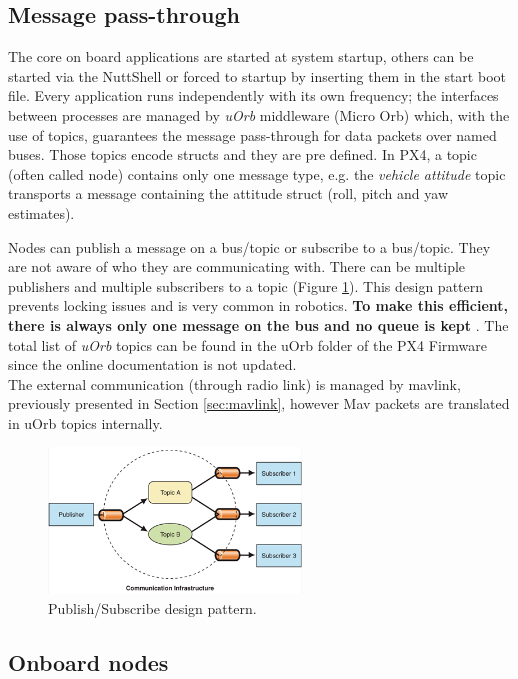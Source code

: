 \subsection{Message pass-through}
The core on board applications are started at system startup, others can be started via the NuttShell or forced to startup by inserting them in the start boot file. Every application runs independently with its own frequency; the interfaces between processes are managed by \textit{uOrb} middleware (Micro Orb) which, with the use of topics, guarantees the message pass-through for data packets over named buses. Those topics encode structs and they are pre defined. In PX4, a topic (often called node) contains only one message type, e.g. the \textit{vehicle attitude} topic transports a message containing the attitude struct (roll, pitch and yaw estimates).\par Nodes can publish a message on a bus/topic or subscribe to a bus/topic. They are not aware of who they are communicating with. There can be multiple publishers and multiple subscribers to a topic (Figure \ref{figure:pubsub}). This design pattern prevents locking issues and is very common in robotics. \textbf{To make this efficient, there is always only one message on the bus and no queue is kept} \cite{uOrb}. The total list of \textit{uOrb} topics can be found in the uOrb folder of the PX4 Firmware since the online documentation is not updated. \\

\noindent
The external communication (through radio link) is managed by mavlink, previously presented in Section \ref{sec:mavlink}, however Mav packets are translated in uOrb topics internally.   

\begin{figure}[h]
	\centering
	\noindent
	\includegraphics[width=0.6\textwidth]{pub_sub.PNG}
	\caption{Publish/Subscribe design pattern.}
	\label{figure:pubsub}
\end{figure}

\subsection{Onboard nodes}


